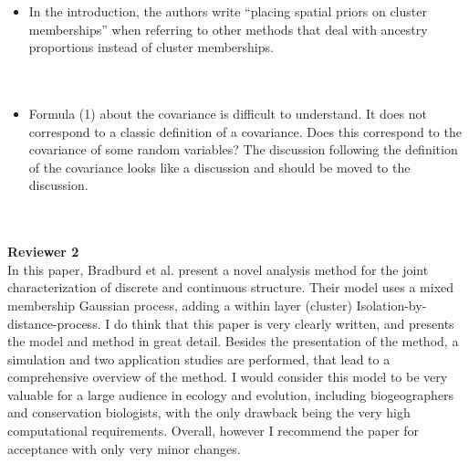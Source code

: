 \documentclass[11pt]{letter}
\newcommand{\gb}[1]{{\bf\color{black}{#1}}}
\begin{document}
\begin{itemize}
\item In the introduction, the authors write ``placing spatial priors on cluster memberships'' when referring to other methods that deal with ancestry proportions instead of cluster memberships.\\\\
\gb{We have edited our wording for clarity (see Lines XX-XX) in the revised manuscript.}\\

\item Formula (1) about the covariance is difficult to understand. It does not correspond to a classic definition of a covariance. Does this correspond to the covariance of some random variables? The discussion following the definition of the covariance looks like a discussion and should be moved to the discussion.\\\\

\gb{
    The definition is a covariance of some random variables; we have made this fact more clear.
    We have also moved some of this discussion to the Discussion (heading ``Allelic or genetic covariance?'').
}\\

\end{itemize}

\textbf{Reviewer 2}\\
In this paper, Bradburd et al. present a novel analysis method for the joint characterization of discrete and continuous structure. Their model uses a mixed membership Gaussian process, adding a within layer (cluster) Isolation-by-distance-process. I do think that this paper is very clearly written, and presents the model and method in great detail. Besides the presentation of the method, a simulation and two application studies are performed, that lead to a comprehensive overview of the method. I would consider this model to be very valuable for a large audience in ecology and evolution, including biogeographers and conservation biologists, with the only drawback being the very high computational requirements. Overall, however I recommend the paper for acceptance with only very minor changes.
\end{document}
